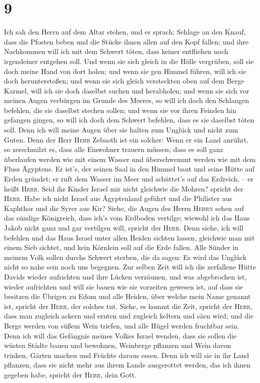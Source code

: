 \hypertarget{section-8}{%
\section{9}\label{section-8}}

 Ich sah den Herrn auf dem Altar stehen, und er sprach:
Schlage an den Knauf, dass die Pfosten beben und die Stücke ihnen allen
auf den Kopf fallen; und ihre Nachkommen will ich mit dem Schwert töten,
dass keiner entfliehen noch irgendeiner entgehen soll. 
Und wenn sie sich gleich in die Hölle vergrüben, soll sie doch meine
Hand von dort holen; und wenn sie gen Himmel führen, will ich sie doch
herunterstoßen;  und wenn sie sich gleich versteckten oben
auf dem Berge Karmel, will ich sie doch daselbst suchen und herabholen;
und wenn sie sich vor meinen Augen verbürgen im Grunde des Meeres, so
will ich doch den Schlangen befehlen, die sie daselbst stechen sollen;
 und wenn sie vor ihren Feinden hin gefangen gingen, so
will ich doch dem Schwert befehlen, dass es sie daselbst töten soll.
Denn ich will meine Augen über sie halten zum Unglück und nicht zum
Guten.  Denn der Herr \textsc{Herr} Zebaoth ist ein
solcher: Wenn er ein Land anrührt, so zerschmilzt es, dass alle
Einwohner trauern müssen; dass es soll ganz überlaufen werden wie mit
einem Wasser und überschwemmt werden wie mit dem Fluss Ägyptens.
 Er ist's, der seinen Saal in den Himmel baut und seine
Hütte auf Erden gründet; er ruft dem Wasser im Meer und schüttet's auf
das Erdreich, -- er heißt \textsc{Herr}.  Seid ihr Kinder
Israel mir nicht gleichwie die Mohren? spricht der \textsc{Herr}. Habe
ich nicht Israel aus Ägyptenland geführt und die Philister aus Kaphthor
und die Syrer aus Kir?  Siehe, die Augen des Herrn
\textsc{Herrn} sehen auf das sündige Königreich, dass ich's vom Erdboden
vertilge; wiewohl ich das Haus Jakob nicht ganz und gar vertilgen will,
spricht der \textsc{Herr}.  Denn siehe, ich will befehlen
und das Haus Israel unter allen Heiden sichten lassen, gleichwie man mit
einem Sieb sichtet, und kein Körnlein soll auf die Erde fallen.
 Alle Sünder in meinem Volk sollen durchs Schwert
sterben, die da sagen: Es wird das Unglück nicht so nahe sein noch uns
begegnen.  Zur selben Zeit will ich die zerfallene Hütte
Davids wieder aufrichten und ihre Lücken verzäunen, und was abgebrochen
ist, wieder aufrichten und will sie bauen wie sie vorzeiten gewesen ist,
 auf dass sie besitzen die Übrigen zu Edom und alle
Heiden, über welche mein Name genannt ist, spricht der \textsc{Herr},
der solches tut.  Siehe, es kommt die Zeit, spricht der
\textsc{Herr}, dass man zugleich ackern und ernten und zugleich keltern
und säen wird; und die Berge werden von süßem Wein triefen, und alle
Hügel werden fruchtbar sein.  Denn ich will das Gefängnis
meines Volkes Israel wenden, dass sie sollen die wüsten Städte bauen und
bewohnen, Weinberge pflanzen und Wein davon trinken, Gärten machen und
Früchte daraus essen.  Denn ich will sie in ihr Land
pflanzen, dass sie nicht mehr aus ihrem Lande ausgerottet werden, das
ich ihnen gegeben habe, spricht der \textsc{Herr}, dein Gott.
